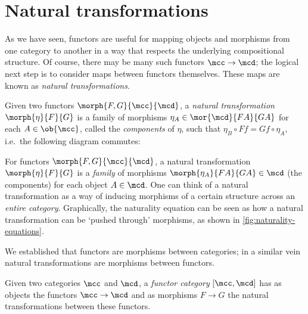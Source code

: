 \section{Natural transformations}\label{sec:natural-transformations}

As we have seen, functors are useful for mapping objects and morphisms from one
category to another in a way that respects the underlying compositional
structure.
Of course, there may be many such functors \(\mcc \to \mcd\); the logical next
step is to consider maps between functors themselves.
These maps are known as \emph{natural transformations}.

\begin{definition}
    Given two functors \(\morph{F, G}{\mcc}{\mcd}\), a
    \emph{natural transformation} \(\morph{\eta}{F}{G}\) is a family of
    morphisms \(
    \eta_A \in \mor{\mcd}{FA}{GA}
    \) for each \(A \in \ob{\mcc}\), called the \emph{components} of \(\eta\),
    such that \(
    \eta_B \circ Ff = Gf \circ \eta_A
    \), i.e.\ the following diagram commutes:
    \begin{center}
        
    \end{center}
\end{definition}

For functors \(\morph{F,G}{\mcc}{\mcd}\), a
natural transformation \(\morph{\eta}{F}{G}\) is a \emph{family} of morphisms
\(\morph{\eta_A}{FA}{GA} \in \mcd\) (the components) for each object
\(A \in \mcd\).
One can think of a natural transformation as a way of inducing
morphisms of a certain structure across an \emph{entire category}.
Graphically, the naturality equation can be seen as how a natural transformation
can be `pushed through' morphisms, as shown in \cref{fig:naturality-equations}.



We established that functors are morphisms between categories; in a similar
vein natural transformations are morphisms between functors.

\begin{definition}
    Given two categories \(\mcc\) and \(\mcd\), a \emph{functor category}
    \([\mcc,\mcd]\) has as objects the functors \(\mcc \to \mcd\) and as
    morphisms \(F \to G\) the natural transformations between these functors.
\end{definition}

